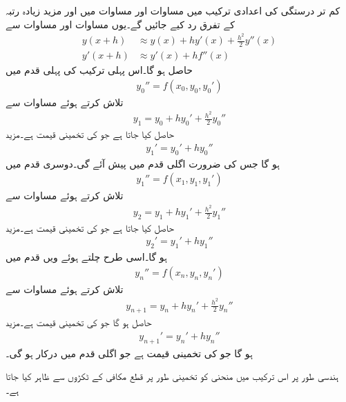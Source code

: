 کم تر درستگی کی اعدادی ترکیب میں مساوات  اور مساوات  میں   اور مزید زیادہ رتبہ کے تفرق رد کیے جائیں گے۔یوں مساوات  اور مساوات  سے
\begin{align*}
y(x+h) & \approx y(x)+hy'(x)+\tfrac{h^2}{2}y''(x)\\
y'(x+h)&\approx y'(x)+hf''(x)
\end{align*}
حاصل ہو گا۔اس پہلی ترکیب کی پہلی قدم میں
\begin{align*}
y_0''=f(x_0,y_0,y_0')
\end{align*}
تلاش کرتے ہوئے  مساوات  سے
\begin{align*}
y_1=y_0+hy_0'+\tfrac{h^2}{2}y_0''
\end{align*}
حاصل کیا جاتا ہے جو  کی تخمینی قیمت ہے۔مزید
\begin{align*}
y_1'=y_0'+hy_0''
\end{align*}
ہو گا جس کی ضرورت اگلی قدم میں پیش آئے گی۔دوسری قدم میں
\begin{align*}
y_1''=f(x_1,y_1,y_1')
\end{align*}
تلاش کرتے ہوئے مساوات  سے
\begin{align*}
y_2=y_1+hy_1'+\tfrac{h^2}{2}y_1''
\end{align*}
حاصل کیا جاتا ہے جو  کی تخمینی قیمت ہے۔مزید
\begin{align*}
y_2'=y_1'+hy_1''
\end{align*}
ہو گا۔اسی طرح چلتے ہوئے  ویں قدم میں 
\begin{align*}
y_n''=f(x_n,y_n,y_n')
\end{align*}
تلاش کرتے ہوئے مساوات  سے
\begin{align}\label{مساوات_اعدادی_دو_درجی_پہلی_الف}
y_{n+1}=y_n+hy_n'+\tfrac{h^2}{2}y_n''
\end{align}
حاصل ہو گا جو  کی تخمینی قیمت ہے۔مزید
\begin{align}\label{مساوات_اعدادی_دو_درجی_پہلی_ب}
y_{n+1}'=y_n'+hy_n''
\end{align}
ہو گا جو  کی تخمینی قیمت ہے جو  اگلی قدم میں درکار ہو گی۔

ہندسی طور پر اس ترکیب میں منحنی  کو  تخمینی طور پر قطع مکافی کے ٹکڑوں سے ظاہر کیا جاتا ہے۔  

